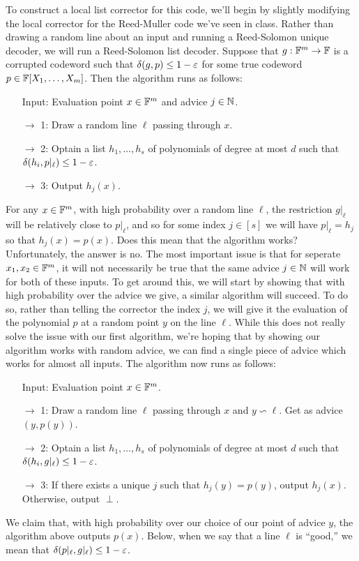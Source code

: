 \documentclass[11pt]{article}
\begin{document}
To construct a local list corrector for this code, we'll begin by slightly modifying the local corrector for the Reed-Muller code we've seen in class. Rather than drawing a random line about an input and running a Reed-Solomon unique decoder, we will run a Reed-Solomon list decoder. Suppose that $g : \mathbb{F}^m \rightarrow \mathbb{F}$ is a corrupted codeword such that $\delta(g, p) \leq 1 - \varepsilon$ for some true codeword $p \in \mathbb{F}[X_1, \ldots, X_m]$. Then the algorithm runs as follows:
\begin{enumerate}
    \item[Input:] Evaluation point $x \in \mathbb{F}^m$ and advice $j \in \mathbb{N}$. 
    \item[$\rightarrow$ 1:] Draw a random line $\ell$ passing through $x$.
    \item[$\rightarrow$ 2:] Optain a list $h_1, \ldots, h_s$ of polynomials of degree at most $d$ such that $\delta(h_i, p |_\ell) \leq 1 - \varepsilon$.
    \item[$\rightarrow$ 3:] Output $h_j(x)$.
\end{enumerate}
For any $x \in \mathbb{F}^m$, with high probability over a random line $\ell$, the restriction $g|_\ell$ will be relatively close to $p|_\ell$, and so for some index $j \in [s]$ we will have $p|_\ell = h_j$ so that $h_j(x) = p(x)$. Does this mean that the algorithm works?
Unfortunately, the answer is no. The most important issue is that for seperate $x_1, x_2 \in \mathbb{F}^m$, it will not necessarily be true that the same advice $j \in \mathbb{N}$ will work for both of these inputs. To get around this, we will start by showing that with high probability over the advice we give, a similar algorithm will succeed. To do so, rather than telling the corrector the index $j$, we will give it the evaluation of the polynomial $p$ at a random point $y$ on the line $\ell$. While this does not really solve the issue with our first algorithm, we're hoping that by showing our algorithm works with random advice, we can find a single piece of advice which works for almost all inputs. The algorithm now runs as follows:
\begin{enumerate}
    \item[Input:] Evaluation point $x \in \mathbb{F}^m$.
    \item[$\rightarrow$ 1:] Draw a random line $\ell$ passing through $x$ and $y \backsim \ell$. Get as advice $(y, p(y))$.
    \item[$\rightarrow$ 2:] Optain a list $h_1, \ldots, h_s$ of polynomials of degree at most $d$ such that $\delta(h_i, g |_\ell) \leq 1 - \varepsilon$.
    \item[$\rightarrow$ 3:] If there exists a unique $j$ such that $h_j(y) = p(y)$, output $h_j(x)$. Otherwise, output $\perp$.
\end{enumerate}
We claim that, with high probability over our choice of our point of advice $y$, the algorithm above outputs $p(x)$. Below, when we say that a line $\ell$ is ``good,'' we mean that $\delta(p|_\ell, g|_\ell) \leq 1 - \varepsilon$.
\end{document}

